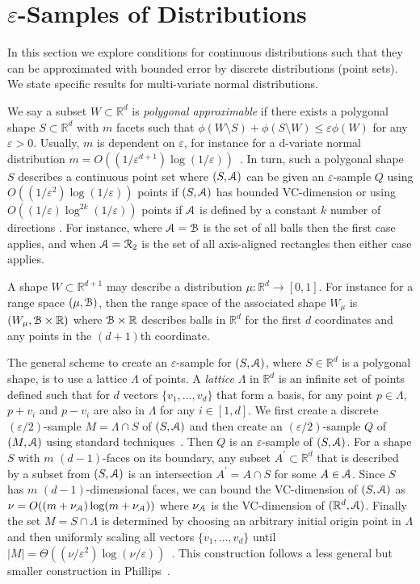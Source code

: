 \documentclass{journal}
\newcommand{\eps}{\varepsilon}
\newcommand{\Eu}[1]{\ensuremath{\EuScript{#1}}}
\newcommand{\R}{\ensuremath{\mathbb{R}}}
\begin{document}
\newpage
\appendix



\section{$\eps$-Samples of Distributions}
\label{sec:eps-dist}
In this section we explore conditions for continuous distributions such that they can be approximated with bounded error by discrete distributions (point sets).  We state specific results for multi-variate normal distributions.  

We say a subset $W \subset \R^d$ is \emph{polygonal approximable} if there exists a polygonal shape $S \subset \R^d$ with $m$ facets such that $\phi(W \setminus S) + \phi(S \setminus W) \leq \eps \phi(W)$ for any $\eps > 0$.  Usually, $m$ is dependent on $\eps$, for instance for a d-variate normal distribution $m = O((1/\eps^{d+1}) \log (1/\eps))$~\cite{Phi08,Phi09}.  In turn, such a polygonal shape $S$ describes a continuous point set where $(S, \Eu{A})$ can be given an $\eps$-sample $Q$ using $O((1/\eps^2) \log (1/\eps))$ points if $(S, \Eu{A})$ has bounded VC-dimension \cite{Mat99} or using $O((1/\eps) \log^{2k} (1/\eps))$ points if $\Eu{A}$ is defined by a constant $k$ number of directions \cite{Phi08}.  For instance, where $\Eu{A} = \Eu{B}$ is the set of all balls then the first case applies, and when $\Eu{A} = \Eu{R}_2$ is the set of all axis-aligned rectangles then either case applies.

A shape $W \subset \R^{d+1}$ may describe a distribution $\mu : \R^d \to [0,1]$.
For instance for a range space $(\mu, \Eu{B})$, then the range space of the associated shape $W_\mu$ is $(W_\mu, \Eu{B} \times \R)$ where $\Eu{B} \times \R$ describes balls in $\R^d$ for the first $d$ coordinates and any points in the $(d+1)$th coordinate.

The general scheme to create an $\eps$-sample for $(S, \Eu{A})$, where $S \in \R^d$ is a polygonal shape, is to use a lattice $\Lambda$ of points.
A \emph{lattice} $\Lambda$ in $\R^d$ is an infinite set of points defined such that for $d$ vectors $\{v_1, \ldots, v_d\}$ that form a basis, for any point $p \in \Lambda$, $p + v_i$ and $p - v_i$ are also in $\Lambda$ for any $i \in [1,d]$.
We first create a discrete $(\eps/2)$-sample $M = \Lambda \cap S$ of  $(S, \Eu{A})$ and then create an $(\eps/2)$-sample $Q$ of $(M, \Eu{A})$ using standard techniques~\cite{CM96,Phi08}.  Then $Q$ is an $\eps$-sample of $(S, \Eu{A})$.
For a shape $S$ with $m$ $(d-1)$-faces on its boundary, any subset $A^\prime \subset \R^d$ that is described by a subset from $(S, \Eu{A})$ is an intersection $A^\prime = A \cap S$ for some $A \in \Eu{A}$.  Since $S$ has $m$ $(d-1)$-dimensional faces, we can bound the VC-dimension of $(S, \Eu{A})$ as $\nu = O((m + \nu_{\Eu{A}}) \log (m+\nu_{\Eu{A}}))$ where $\nu_{\Eu{A}}$ is the VC-dimension of $(\R^d, \Eu{A})$.
Finally the set $M = S \cap \Lambda$ is determined by choosing an arbitrary initial origin point in $\Lambda$ and then uniformly scaling all vectors $\{v_1, \ldots, v_d\}$ until $|M| = \Theta((\nu/\eps^2) \log (\nu/\eps))$~\cite{Mat99}.  This construction follows a less general but smaller construction in Phillips~\cite{Phi08}.
\end{document}
